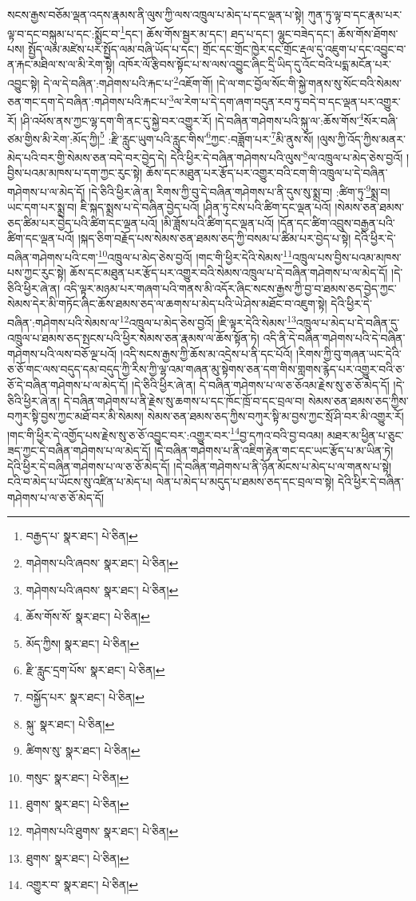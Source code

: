 སངས་རྒྱས་བཅོམ་ལྡན་འདས་རྣམས་ནི་ལུས་ཀྱི་ལས་འཁྲུལ་པ་མེད་པ་དང་ལྡན་པ་སྟེ། ཀུན་ཏུ་ལྟ་བ་དང་རྣམ་པར་ལྟ་བ་དང་བསྐུམ་པ་དང་:སྨྱོང་བ་\footnote{བརྒྱད་པ་  སྣར་ཐང་།  པེ་ཅིན། }དང་། ཆོས་གོས་སྦྱར་མ་དང་། ཐད་པ་དང་། ལྷུང་བཟེད་དང་། ཆོས་གོས་ཐོགས་པས། སྤྱོད་ལམ་མཛེས་པར་སྤྱོད་ལམ་བཞི་ཡོད་པ་དང་། གྲོང་དང་གྲོང་ཁྱེར་དང་གྲོང་རྡལ་དུ་འཇུག་པ་དང་འབྱུང་བ་ན་རྐང་མཐིལ་ས་ལ་མི་རེག་སྟེ། འཁོར་ལོ་རྩིབས་སྟོང་པ་ས་ལས་འབྱུང་ཞིང་དྲི་ཡིད་དུ་འོང་བའི་པདྨ་མངོན་པར་འབྱུང་སྟེ། དེ་ལ་དེ་བཞིན་:གཤེགས་པའི་རྐང་པ་\footnote{གཤེགས་པའི་ཞབས་  སྣར་ཐང་།  པེ་ཅིན། }འཇོག་གོ། །དེ་ལ་གང་བྱོལ་སོང་གི་སྐྱེ་གནས་སུ་སོང་བའི་སེམས་ཅན་གང་དག་དེ་བཞིན་:གཤེགས་པའི་རྐང་པ་\footnote{གཤེགས་པའི་ཞབས་  སྣར་ཐང་།  པེ་ཅིན། }ལ་རེག་པ་དེ་དག་ཞག་བདུན་རབ་ཏུ་བདེ་བ་དང་ལྡན་པར་འགྱུར་རོ། །ཤི་འཕོས་ནས་ཀྱང་ལྷ་དག་གི་ནང་དུ་སྐྱེ་བར་འགྱུར་རོ། །དེ་བཞིན་གཤེགས་པའི་སྐུ་ལ་:ཆོས་གོས་\footnote{ཆོས་གོས་སོ་  སྣར་ཐང་།  པེ་ཅིན། }སོར་བཞི་ཙམ་གྱིས་མི་རེག་:མོད་ཀྱི།\footnote{མོད་ཀྱིས།  སྣར་ཐང་།  པེ་ཅིན། } :རྫི་རླུང་ཡུག་པའི་རླུང་གིས་\footnote{རྫི་རླུང་དྲག་པོས་  སྣར་ཐང་།  པེ་ཅིན། }ཀྱང་:བཟློག་པར་\footnote{བསྐྱོད་པར་  སྣར་ཐང་།  པེ་ཅིན། }མི་ནུས་སོ། །ལུས་ཀྱི་འོད་ཀྱིས་མནར་མེད་པའི་བར་གྱི་སེམས་ཅན་བདེ་བར་བྱེད་དེ། དེའི་ཕྱིར་དེ་བཞིན་གཤེགས་པའི་ལུས་\footnote{སྐུ་  སྣར་ཐང་།  པེ་ཅིན། }ལ་འཁྲུལ་པ་མེད་ཅེས་བྱའོ། །བྱིས་པའམ་མཁས་པ་དག་ཀྱང་རུང་སྟེ། ཆོས་དང་མཐུན་པར་རྩོད་པར་འགྱུར་བའི་ངག་གི་འཁྲུལ་པ་དེ་བཞིན་གཤེགས་པ་ལ་མེད་དོ། །དེ་ཅིའི་ཕྱིར་ཞེ་ན། རིགས་ཀྱི་བུ་དེ་བཞིན་གཤེགས་པ་ནི་དུས་སུ་སྨྲ་བ། :ཚིག་ཏུ་\footnote{ཚིགས་སུ་  སྣར་ཐང་།  པེ་ཅིན། }སྨྲ་བ། ཡང་དག་པར་སྨྲ་བ། ཇི་སྐད་སྨྲས་པ་དེ་བཞིན་བྱེད་པའོ། །ཤིན་ཏུ་ངེས་པའི་ཚིག་དང་ལྡན་པའོ། །སེམས་ཅན་ཐམས་ཅད་ཚིམ་པར་བྱེད་པའི་ཚིག་དང་ལྡན་པའོ། །མི་ཟློས་པའི་ཚིག་དང་ལྡན་པའོ། །དོན་དང་ཚིག་འབྲུས་བརྒྱན་པའི་ཚིག་དང་ལྡན་པའོ། །སྐད་ཅིག་བརྗོད་པས་སེམས་ཅན་ཐམས་ཅད་ཀྱི་བསམ་པ་ཚིམ་པར་བྱེད་པ་སྟེ། དེའི་ཕྱིར་དེ་བཞིན་གཤེགས་པའི་ངག་\footnote{གསུང་  སྣར་ཐང་།  པེ་ཅིན། }འཁྲུལ་པ་མེད་ཅེས་བྱའོ། །གང་གི་ཕྱིར་དེའི་སེམས་\footnote{ཐུགས་  སྣར་ཐང་།  པེ་ཅིན། }འཁྲུལ་པས་བྱིས་པའམ་མཁས་པས་ཀྱང་རུང་སྟེ། ཆོས་དང་མཐུན་པར་རྩོད་པར་འགྱུར་བའི་སེམས་འཁྲུལ་པ་དེ་བཞིན་གཤེགས་པ་ལ་མེད་དོ། །དེ་ཅིའི་ཕྱིར་ཞེ་ན། འདི་ལྟར་མཉམ་པར་གཞག་པའི་གནས་མི་འདོར་ཞིང་སངས་རྒྱས་ཀྱི་བྱ་བ་ཐམས་ཅད་བྱེད་ཀྱང་སེམས་དེར་མི་གཏོང་ཞིང་ཆོས་ཐམས་ཅད་ལ་ཆགས་པ་མེད་པའི་ཡེ་ཤེས་མཐོང་བ་འཇུག་སྟེ། དེའི་ཕྱིར་དེ་བཞིན་:གཤེགས་པའི་སེམས་ལ་\footnote{གཤེགས་པའི་ཐུགས་  སྣར་ཐང་།  པེ་ཅིན། }འཁྲུལ་པ་མེད་ཅེས་བྱའོ། །ཇི་ལྟར་དེའི་སེམས་\footnote{ཐུགས་  སྣར་ཐང་།  པེ་ཅིན། }འཁྲུལ་པ་མེད་པ་དེ་བཞིན་དུ་འཁྲུལ་པ་ཐམས་ཅད་སྤངས་པའི་ཕྱིར་སེམས་ཅན་རྣམས་ལ་ཆོས་སྟོན་ཏེ། འདི་ནི་དེ་བཞིན་གཤེགས་པའི་དེ་བཞིན་གཤེགས་པའི་ལས་བཅོ་ལྔ་པའོ། །འདི་སངས་རྒྱས་ཀྱི་ཆོས་མ་འདྲེས་པ་ནི་དང་པོའོ། །རིགས་ཀྱི་བུ་གཞན་ཡང་དེའི་ཅ་ཅོ་གང་ལས་བདུད་དམ་བདུད་ཀྱི་རིས་ཀྱི་ལྷ་འམ་གཞན་མུ་སྟེགས་ཅན་དག་གིས་གླགས་རྙེད་པར་འགྱུར་བའི་ཅ་ཅོ་དེ་བཞིན་གཤེགས་པ་ལ་མེད་དོ། །དེ་ཅིའི་ཕྱིར་ཞེ་ན། དེ་བཞིན་གཤེགས་པ་ལ་ཅ་ཅོའམ་རྗེས་སུ་ཅ་ཅོ་མེད་དོ། །དེ་ཅིའི་ཕྱིར་ཞེ་ན། དེ་བཞིན་གཤེགས་པ་ནི་རྗེས་སུ་ཆགས་པ་དང་ཁོང་ཁྲོ་བ་དང་བྲལ་བ། སེམས་ཅན་ཐམས་ཅད་ཀྱིས་བཀུར་སྟི་བྱས་ཀྱང་མཐོ་བར་མི་སེམས། སེམས་ཅན་ཐམས་ཅད་ཀྱིས་བཀུར་སྟི་མ་བྱས་ཀྱང་སྲོ་ཤི་བར་མི་འགྱུར་རོ། །གང་གི་ཕྱིར་དེ་འགྱོད་པས་རྗེས་སུ་ཅ་ཅོ་འབྱུང་བར་:འགྱུར་བར་\footnote{འགྱུར་བ་  སྣར་ཐང་།  པེ་ཅིན། }བྱ་དཀའ་བའི་བྱ་བའམ། མཐར་མ་ཕྱིན་པ་ཅུང་ཟད་ཀྱང་དེ་བཞིན་གཤེགས་པ་ལ་མེད་དོ། །དེ་བཞིན་གཤེགས་པ་ནི་འཇིག་རྟེན་གང་དང་ཡང་རྩོད་པ་མ་ཡིན་ཏེ། དེའི་ཕྱིར་དེ་བཞིན་གཤེགས་པ་ལ་ཅ་ཅོ་མེད་དོ། །དེ་བཞིན་གཤེགས་པ་ནི་ཉོན་མོངས་པ་མེད་པ་ལ་གནས་པ་སྟེ། ངའི་བ་མེད་པ་ཡོངས་སུ་འཛིན་པ་མེད་པ། ལེན་པ་མེད་པ་མདུད་པ་ཐམས་ཅད་དང་བྲལ་བ་སྟེ། དེའི་ཕྱིར་དེ་བཞིན་གཤེགས་པ་ལ་ཅ་ཅོ་མེད་དོ། 